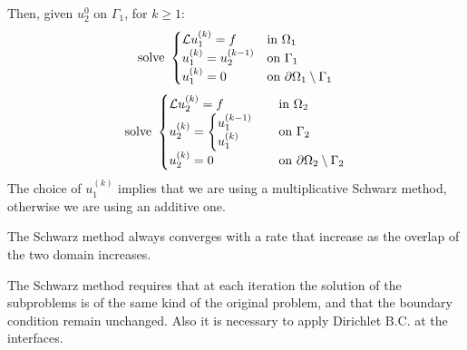 Then, given \(u_2^0\) on \(\Gamma_1\), for \(k \geq 1\):
\begin{equation*}
    \text{solve }\begin{cases}
        \mathcal{L} u^{(k)}_1 = f & \text{in } \Omega_1 \\
        u^{(k)}_1 = u^{(k-1)}_2 & \text{on } \Gamma_1 \\
        u^{(k)}_1 = 0 & \text{on } {\partial\Omega}_1\setminus \Gamma_1
    \end{cases}
\end{equation*}
\begin{equation*}
    \text{solve }\begin{cases}
        \mathcal{L} u^{(k)}_2 = f & \text{in } \Omega_2 \\
        u^{(k)}_2 = \begin{cases}
            u^{(k-1)}_1 \\
            u^{(k)}_1 
        \end{cases} & \text{on } \Gamma_2 \\
        u^{(k)}_2 = 0 & \text{on } {\partial\Omega}_2\setminus \Gamma_2
    \end{cases}
\end{equation*}
The choice of \(u^{(k)}_1\) implies that we are using a multiplicative Schwarz method, otherwise we are using an additive one.

The Schwarz method always converges with a rate that increase as the overlap of the two domain increases.
\begin{remark}
    The Schwarz method requires that at each iteration the solution of the subproblems is of the same kind of the original problem, and that the boundary condition remain unchanged. Also it is necessary to apply Dirichlet B.C. at the interfaces.
\end{remark}
